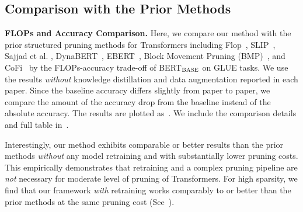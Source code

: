 \subsection{Comparison with the Prior Methods}
\label{subsection:comparison}

\textbf{FLOPs and Accuracy Comparison.}
Here, we compare our method with the prior structured pruning methods for Transformers including 
Flop~\cite{wang2019structured}, 
SLIP~\cite{lin2020pruning}, 
Sajjad et al. \cite{sajjad2020effect}, 
DynaBERT~\cite{hou2020dynabert}, 
EBERT~\cite{liu2021ebert}, 
Block Movement Pruning (BMP)~\cite{lagunas2021block}, and CoFi~\cite{xia2022structured} by the FLOPs-accuracy trade-off of BERT$_\textsc{BASE}$ on GLUE tasks.
We use the results \textit{without} knowledge distillation and data augmentation reported in each paper. 
Since the baseline accuracy differs slightly from paper to paper, 
we compare the amount of the accuracy drop from the baseline instead of the absolute accuracy.
The results are plotted as~.
We include the comparison details and full table in~.

Interestingly, our method exhibits comparable or better results than the prior methods \textit{without} any model retraining and with substantially lower pruning costs.
This empirically demonstrates that retraining and a complex pruning pipeline are \textit{not} necessary for moderate level of pruning of Transformers.
For high sparsity, we find that our framework \textit{with} retraining works comparably to or better than the prior methods at the same pruning cost (See~).

